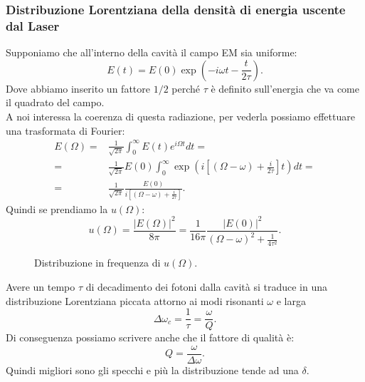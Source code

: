 \subsubsection{Distribuzione Lorentziana della densità di energia uscente dal Laser}%
Supponiamo che all'interno della cavità il campo EM sia uniforme:
\[
    E(t) = E(0) \exp\left(-i\omega t- \frac{t}{2\tau}\right)
.\] 
Dove abbiamo inserito un fattore $1 /2$ perché $\tau$ è definito sull'energia che va come il quadrato del campo.\\
A noi interessa la coerenza di questa radiazione, per vederla possiamo effettuare una trasformata di Fourier:
\[\begin{aligned}
    E(\Omega) =& \frac{1}{\sqrt{2\pi} }\int_{0}^{\infty} E(t) e^{i\Omega t}dt=\\
    =&
    \frac{1}{\sqrt{2\pi}}E(0)\int_{0}^{\infty} 
    \exp\left(i\left[\left(\Omega -\omega\right)+ \frac{i}{2\tau}\right]t\right) dt=\\
    =&
    \frac{1}{\sqrt{2\pi}}
    \frac{E(0)}{i\left[\left(\Omega-\omega\right)+\frac{i}{2\tau}\right]}
.\end{aligned}\]
Quindi se prendiamo la $u(\Omega)$:
\[
    u(\Omega) = \frac{\left|E(\Omega)\right|^2}{8\pi} = \frac{1}{16\pi} 
    \frac{\left|E(0)\right|^2}{\left(\Omega-\omega\right)^2+ \frac{1}{4\tau^2}}
.\] 
\begin{figure}[H]
    \centering
    \caption{Distribuzione in frequenza di $u(\Omega)$.}
    \label{Lorentziana}
\end{figure}
\noindent
Avere un tempo $\tau$ di decadimento dei fotoni dalla cavità si traduce in una distribuzione Lorentziana piccata attorno ai modi risonanti $\omega$ e larga
\[
  \Delta\omega_c = \frac{1}{\tau}=\frac{\omega}{Q}  
.\] 
Di conseguenza possiamo scrivere anche che il fattore di qualità è:
\[
Q = \frac{\omega}{\Delta\omega}
.\] 
Quindi migliori sono gli specchi e più la distribuzione tende ad una $\delta$.

